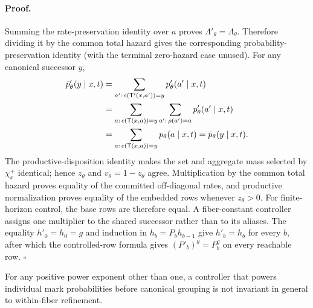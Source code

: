 \paragraph{Proof.}
Summing the rate-preservation identity over $a$ proves
$\Lambda'_\theta=\Lambda_\theta$. Therefore dividing it by the common total
hazard gives the corresponding probability-preservation identity (with the
terminal zero-hazard case unused). For any canonical successor $y$,
\begin{align}
  \bar p'_\theta(y\mid x,t)
  &=
  \sum_{a':\,c(\mathsf{T}'(x,a'))=y}p'_\theta(a'\mid x,t) \notag\\
  &=
  \sum_{a:\,c(\mathsf{T}(x,a))=y}
  \sum_{a':\,\rho(a')=a}p'_\theta(a'\mid x,t) \notag\\
  &=
  \sum_{a:\,c(\mathsf{T}(x,a))=y}p_\theta(a\mid x,t)
  =
  \bar p_\theta(y\mid x,t).
\end{align}
The productive-disposition identity makes the set and aggregate mass selected
by $\chi_x^+$ identical; hence $z_\theta$ and
$v_\theta=1-z_\theta$ agree. Multiplication by the common total hazard proves
equality of the committed off-diagonal rates, and productive normalization
proves equality of the embedded rows whenever $z_\theta>0$. For
finite-horizon control, the base rows are therefore equal. A fiber-constant
controller assigns one multiplier to the shared successor rather than to its
aliases. The equality $h'_0=h_0=g$ and induction in
$h_b=P_bh_{b-1}$ give $h'_b=h_b$ for every $b$, after which the controlled-row
formula gives $(P'_b)^g=P_b^g$ on every reachable row.
\hfill$\square$

\begin{composeappendixproposition}
\label{prop:app-compose-mark-negative}
For any positive power exponent other than one, a controller that powers
individual mark probabilities before canonical grouping is not invariant in
general to within-fiber refinement.
\end{composeappendixproposition}

